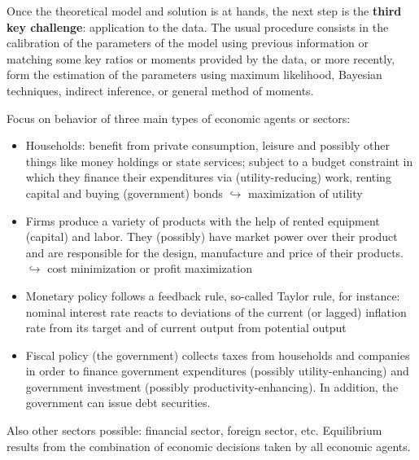 \begin{Solution}{1}
	Once the theoretical model and solution is at hands, the next step is the \textbf{third key challenge}: application to the data. The usual procedure consists in the calibration of the parameters of the model using previous information or matching some key ratios or moments provided by the data, or more recently, form the estimation of the parameters using maximum likelihood, Bayesian techniques, indirect inference, or general method of moments.


	
\end{Solution}
\begin{Solution}{2}
	Focus on behavior of three main types of economic agents or sectors:
	\begin{itemize}
		\item Households: benefit from private consumption, leisure and possibly other things like money holdings or state services; subject to a budget constraint in which they finance their expenditures via (utility-reducing) work, renting capital and buying (government) bonds $\hookrightarrow$ maximization of utility
		\item Firms produce a variety of products with the help of rented equipment (capital) and labor. They (possibly) have market power over their product and are responsible for the design, manufacture and price of their products. $\hookrightarrow$
		cost minimization or profit maximization
		\item Monetary policy follows a feedback rule, so-called Taylor rule, for instance: nominal interest rate reacts to deviations of the current (or lagged) inflation rate from its target and of current output from potential output
		\item Fiscal policy (the government) collects taxes from households and companies in order to finance government expenditures (possibly utility-enhancing) and government investment (possibly productivity-enhancing). In addition, the government can issue debt securities.
		\end{itemize}
	Also other sectors possible: financial sector, foreign sector, etc. Equilibrium results from the combination of economic decisions taken by all economic agents.


\end{Solution}
